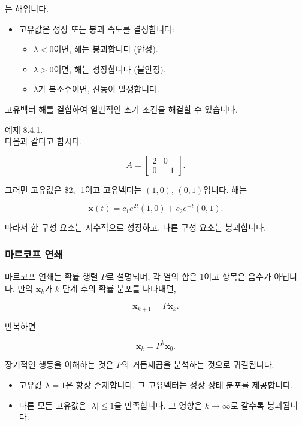 \documentclass[
  12pt,
  a4paper,
]{article}
\begin{document}
는 해입니다.

\begin{itemize}
\item
  고유값은 성장 또는 붕괴 속도를 결정합니다:

  \begin{itemize}
  \item
    \(\lambda < 0\)이면, 해는 붕괴합니다 (안정).
  \item
    \(\lambda > 0\)이면, 해는 성장합니다 (불안정).
  \item
    \(\lambda\)가 복소수이면, 진동이 발생합니다.
  \end{itemize}
\end{itemize}

고유벡터 해를 결합하여 일반적인 초기 조건을 해결할 수 있습니다.

예제 8.4.1.\\
다음과 같다고 합시다.

\[A = \begin{bmatrix}
2 & 0 \\
0 & -1 \end{bmatrix}.\]

그러면 고유값은 \$2, -1\)이고 고유벡터는 \((1,0)\), \((0,1)\)입니다. 해는

\[\mathbf{x}(t) = c_1 e^{2t}(1,0) + c_2 e^{-t}(0,1).\]

따라서 한 구성 요소는 지수적으로 성장하고, 다른 구성 요소는 붕괴합니다.

\subsubsection{마르코프 연쇄}\label{markov-chains}

마르코프 연쇄는 확률 행렬 \(P\)로 설명되며, 각 열의 합은 1이고 항목은 음수가 아닙니다. 만약 \(\mathbf{x}_k\)가 \(k\) 단계 후의 확률 분포를 나타내면,

\[\mathbf{x}_{k+1} = P \mathbf{x}_k.\]

반복하면

\[\mathbf{x}_k = P^k \mathbf{x}_0.\]

장기적인 행동을 이해하는 것은 \(P\)의 거듭제곱을 분석하는 것으로 귀결됩니다.

\begin{itemize}
\item
  고유값 \(\lambda = 1\)은 항상 존재합니다. 그 고유벡터는 정상 상태 분포를 제공합니다.
\item
  다른 모든 고유값은 \(|\lambda| \leq 1\)을 만족합니다. 그 영향은 \(k \to \infty\)로 갈수록 붕괴됩니다.
\end{itemize}
\end{document}
